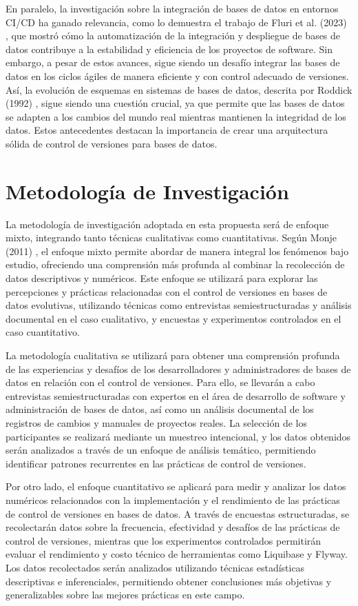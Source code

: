 \documentclass{IEEEtran}
\begin{document}
En paralelo, la investigación sobre la integración de bases de datos en entornos CI/CD ha ganado relevancia, como lo demuestra el trabajo de Fluri et al. (2023) \cite{fluri2023measuring}, que mostró cómo la automatización de la integración y despliegue de bases de datos contribuye a la estabilidad y eficiencia de los proyectos de software. Sin embargo, a pesar de estos avances, sigue siendo un desafío integrar las bases de datos en los ciclos ágiles de manera eficiente y con control adecuado de versiones. Así, la evolución de esquemas en sistemas de bases de datos, descrita por Roddick (1992) \cite{roddick1992schema}, sigue siendo una cuestión crucial, ya que permite que las bases de datos se adapten a los cambios del mundo real mientras mantienen la integridad de los datos. Estos antecedentes destacan la importancia de crear una arquitectura sólida de control de versiones para bases de datos.

\section{Metodología de Investigación}
La metodología de investigación adoptada en esta propuesta será de enfoque mixto, integrando tanto técnicas cualitativas como cuantitativas. Según Monje (2011) \cite{Monje2011}, el enfoque mixto permite abordar de manera integral los fenómenos bajo estudio, ofreciendo una comprensión más profunda al combinar la recolección de datos descriptivos y numéricos. Este enfoque se utilizará para explorar las percepciones y prácticas relacionadas con el control de versiones en bases de datos evolutivas, utilizando técnicas como entrevistas semiestructuradas y análisis documental en el caso cualitativo, y encuestas y experimentos controlados en el caso cuantitativo.

La metodología cualitativa se utilizará para obtener una comprensión profunda de las experiencias y desafíos de los desarrolladores y administradores de bases de datos en relación con el control de versiones. Para ello, se llevarán a cabo entrevistas semiestructuradas con expertos en el área de desarrollo de software y administración de bases de datos, así como un análisis documental de los registros de cambios y manuales de proyectos reales. La selección de los participantes se realizará mediante un muestreo intencional, y los datos obtenidos serán analizados a través de un enfoque de análisis temático, permitiendo identificar patrones recurrentes en las prácticas de control de versiones.

Por otro lado, el enfoque cuantitativo se aplicará para medir y analizar los datos numéricos relacionados con la implementación y el rendimiento de las prácticas de control de versiones en bases de datos. A través de encuestas estructuradas, se recolectarán datos sobre la frecuencia, efectividad y desafíos de las prácticas de control de versiones, mientras que los experimentos controlados permitirán evaluar el rendimiento y costo técnico de herramientas como Liquibase y Flyway. Los datos recolectados serán analizados utilizando técnicas estadísticas descriptivas e inferenciales, permitiendo obtener conclusiones más objetivas y generalizables sobre las mejores prácticas en este campo.
\end{document}
